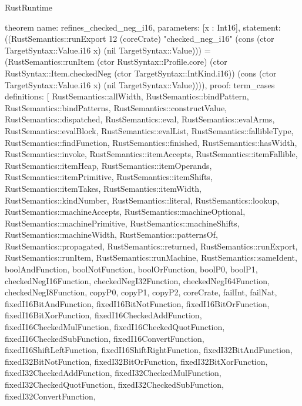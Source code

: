 \begin{lexlean}{RustRuntime}
\begin{semanticmodule}
theorem{
  name: refines_checked_neg_i16,
  parameters: [x : Int16],
  statement: ((RustSemantics::runExport 12 (coreCrate) "checked_neg_i16" (cons (ctor TargetSyntax::Value.i16 x) (nil TargetSyntax::Value))) = (RustSemantics::runItem (ctor RustSyntax::Profile.core) (ctor RustSyntax::Item.checkedNeg (ctor TargetSyntax::IntKind.i16)) (cons (ctor TargetSyntax::Value.i16 x) (nil TargetSyntax::Value)))),
  proof: term_cases{
    definitions: [
      RustSemantics::allWidth,
      RustSemantics::bindPattern,
      RustSemantics::bindPatterns,
      RustSemantics::constructValue,
      RustSemantics::dispatched,
      RustSemantics::eval,
      RustSemantics::evalArms,
      RustSemantics::evalBlock,
      RustSemantics::evalList,
      RustSemantics::fallibleType,
      RustSemantics::findFunction,
      RustSemantics::finished,
      RustSemantics::hasWidth,
      RustSemantics::invoke,
      RustSemantics::itemAccepts,
      RustSemantics::itemFallible,
      RustSemantics::itemHeap,
      RustSemantics::itemOperands,
      RustSemantics::itemPrimitive,
      RustSemantics::itemShifts,
      RustSemantics::itemTakes,
      RustSemantics::itemWidth,
      RustSemantics::kindNumber,
      RustSemantics::literal,
      RustSemantics::lookup,
      RustSemantics::machineAccepts,
      RustSemantics::machineOptional,
      RustSemantics::machinePrimitive,
      RustSemantics::machineShifts,
      RustSemantics::machineWidth,
      RustSemantics::patternsOf,
      RustSemantics::propagated,
      RustSemantics::returned,
      RustSemantics::runExport,
      RustSemantics::runItem,
      RustSemantics::runMachine,
      RustSemantics::sameIdent,
      boolAndFunction,
      boolNotFunction,
      boolOrFunction,
      boolP0,
      boolP1,
      checkedNegI16Function,
      checkedNegI32Function,
      checkedNegI64Function,
      checkedNegI8Function,
      copyP0,
      copyP1,
      copyP2,
      coreCrate,
      failInt,
      failNat,
      fixedI16BitAndFunction,
      fixedI16BitNotFunction,
      fixedI16BitOrFunction,
      fixedI16BitXorFunction,
      fixedI16CheckedAddFunction,
      fixedI16CheckedMulFunction,
      fixedI16CheckedQuotFunction,
      fixedI16CheckedSubFunction,
      fixedI16ConvertFunction,
      fixedI16ShiftLeftFunction,
      fixedI16ShiftRightFunction,
      fixedI32BitAndFunction,
      fixedI32BitNotFunction,
      fixedI32BitOrFunction,
      fixedI32BitXorFunction,
      fixedI32CheckedAddFunction,
      fixedI32CheckedMulFunction,
      fixedI32CheckedQuotFunction,
      fixedI32CheckedSubFunction,
      fixedI32ConvertFunction,
}}
\end{semanticmodule}
\end{lexlean}

